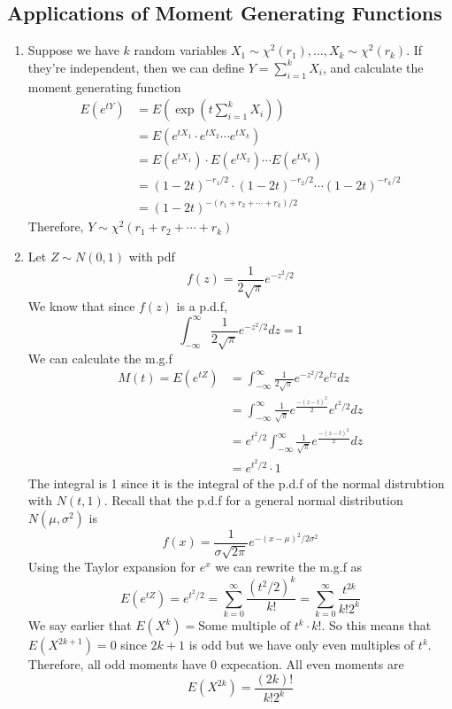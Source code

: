 \documentclass[openany]{report}
\begin{document}
\subsection{Applications of Moment Generating Functions}
\begin{enumerate}
    \item Suppose we have $k$ random variables $X_1 \sim \chi^2(r_1), \ldots, X_k \sim \chi^2(r_k)$.  If they're independent, then we can define $Y = \sum\limits_{i=1}^k X_i$, and calculate the moment generating function 
    \begin{align*}
        E(e^{tY}) &= E\left(\exp\left(t\sum_{i=1}^k X_i\right)\right)\\
        &= E(e^{tX_1} \cdot e^{tX_2} \cdots e^{tX_k})\\
        &= E(e^{tX_1}) \cdot E(e^{tX_2}) \cdots E(e^{tX_k})\\
        &= (1-2t)^{-r_1/2} \cdot (1-2t)^{-r_2/2} \cdots (1-2t)^{-r_k/2}\\
        &= (1-2t)^{-(r_1 + r_2 + \cdots + r_k)/2}
    \end{align*}
    Therefore, $Y \sim \chi^2(r_1 + r_2 + \cdots + r_k)$
    \item Let $Z \sim N(0,1)$ with pdf 
    \[f(z) = \frac{1}{2\sqrt{\pi}}e^{-z^2/2}\]
    We know that since $f(z)$ is a p.d.f,
    \[\int_{-\infty}^\infty \frac{1}{2\sqrt{\pi}}e^{-z^2/2}dz = 1\]
    We can calculate the m.g.f 
    \begin{align*}
        M(t) = E(e^{tZ}) &= \int_{-\infty}^\infty \frac{1}{2\sqrt{\pi}}e^{-z^2/2}e^{tz}dz\\
        &= \int_{-\infty}^\infty \frac{1}{\sqrt{\pi}}e^{\frac{-(z-t)^2}{2}}e^{t^2/2}dz\\
        &= e^{t^2/2}\int_{-\infty}^\infty \frac{1}{\sqrt{\pi}}e^{\frac{-(z-t)^2}{2}}dz\\
        &= e^{t^2/2} \cdot 1
    \end{align*} 
    The integral is 1 since it is the integral of the p.d.f of the normal distrubtion with $N(t, 1)$. Recall that the p.d.f for a general normal distribution $N(\mu, \sigma^2)$ is 
    \[f(x) = \frac{1}{\sigma\sqrt{2\pi}}e^{-(x-\mu)^2/2\sigma^2}\]
    Using the Taylor expansion for $e^x$ we can rewrite the m.g.f as 
    \[E(e^{tZ}) = e^{t^2/2} = \sum_{k=0}^\infty \frac{(t^2/2)^k}{k!} = \sum_{k=0}^\infty \frac{t^{2k}}{k!2^k}\]
    We say earlier that $E(X^k) = \text{Some multiple of $t^k$} \cdot k!$. So this means that $E(X^{2k+1}) = 0$ since $2k+1$ is odd but we have only even multiples of $t^k$. Therefore, all odd moments have 0 expecation. All even moments are 
    \[E(X^{2k}) = \frac{(2k)!}{k!2^k}\]
\end{enumerate}
\end{document}
